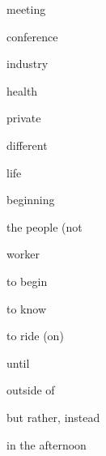 \documentclass[avery5371,grid,frame]{flashcards}
\begin{document}
\begin{flashcard}{\LARGE meeting}
\LARGE {}
\end{flashcard}
\begin{flashcard}{\LARGE conference}
\LARGE {}
\end{flashcard}
\begin{flashcard}{\LARGE industry}
\LARGE {}
\end{flashcard}
\begin{flashcard}{\LARGE health}
\LARGE {}
\end{flashcard}
\begin{flashcard}{\LARGE private}
\LARGE {}
\end{flashcard}
\begin{flashcard}{\LARGE different}
\LARGE {}
\end{flashcard}
\begin{flashcard}{\LARGE life}
\LARGE {}
\end{flashcard}
\begin{flashcard}{\LARGE beginning}
\LARGE {}
\end{flashcard}
\begin{flashcard}{\LARGE the people (not }
\LARGE {}
\end{flashcard}
\begin{flashcard}{\LARGE worker}
\LARGE {}
\end{flashcard}
\begin{flashcard}{\LARGE to begin}
\LARGE {}
\end{flashcard}
\begin{flashcard}{\LARGE to know}
\LARGE {}
\end{flashcard}
\begin{flashcard}{\LARGE to ride (on)}
\LARGE {}
\end{flashcard}
\begin{flashcard}{\LARGE until}
\LARGE {}
\end{flashcard}
\begin{flashcard}{\LARGE outside of}
\LARGE {}
\end{flashcard}
\begin{flashcard}{\LARGE but rather, instead}
\LARGE {}
\end{flashcard}
\begin{flashcard}{\LARGE in the afternoon}
\LARGE {}
\end{flashcard}
\end{document}
